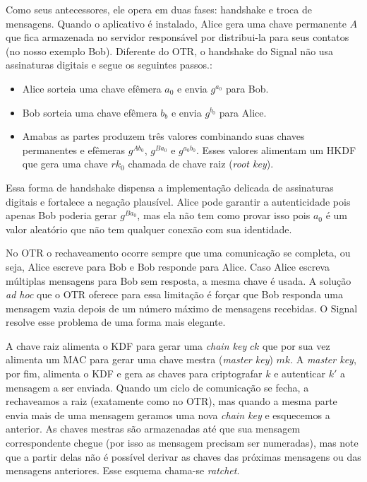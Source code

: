 Como seus antecessores, ele opera em duas fases: handshake e troca de mensagens.
Quando o aplicativo é instalado, Alice gera uma chave permanente $A$ que fica armazenada no servidor responsável por distribui-la para seus contatos (no nosso exemplo Bob).
Diferente do OTR, o handshake do Signal não usa assinaturas digitais e segue os seguintes passos.:
\begin{itemize}
\item Alice sorteia uma chave efêmera $a_0$ e envia $g^{a_0}$ para Bob.
\item Bob sorteia uma chave efêmera $b_b$ e envia $g^{b_0}$ para Alice.
\item Amabas as partes produzem três valores combinando suas chaves permanentes e efêmeras $g^{Ab_0}$, $g^{Ba_0}$ e $g^{a_0b_0}$.
  Esses valores alimentam um HKDF que gera uma chave $rk_0$ chamada de chave raiz ({\em root key}).
\end{itemize}

Essa forma de handshake dispensa a implementação delicada de assinaturas digitais e fortalece a negação plausível.
Alice pode garantir a autenticidade pois apenas Bob poderia gerar $g^{Ba_0}$, mas ela não tem como provar isso pois $a_0$ é um valor aleatório que não tem qualquer conexão com sua identidade.

No OTR o rechaveamento ocorre sempre que uma comunicação se completa, ou seja, Alice escreve para Bob e Bob responde para Alice.
Caso Alice escreva múltiplas mensagens para Bob sem resposta, a mesma chave é usada.
A solução {\em ad hoc} que o OTR oferece para essa limitação é forçar que Bob responda uma mensagem vazia depois de um número máximo de mensagens recebidas.
O Signal resolve esse problema de uma forma mais elegante.

A chave raiz alimenta o KDF para gerar uma {\em chain key} $ck$ que por sua vez alimenta um MAC para gerar uma chave mestra ({\em master key}) $mk$.
A {\em master key}, por fim, alimenta o KDF e gera as chaves para criptografar $k$ e autenticar $k'$ a mensagem a ser enviada.
Quando um ciclo de comunicação se fecha, a rechaveamos a raiz (exatamente como no OTR), mas quando a mesma parte envia mais de uma mensagem geramos uma nova {\em chain key} e esquecemos a anterior.
As chaves mestras são armazenadas até que sua mensagem correspondente chegue (por isso as mensagem precisam ser numeradas), mas note que a partir delas não é possível derivar as chaves das próximas mensagens ou das mensagens anteriores.
Esse esquema chama-se {\em ratchet}.

